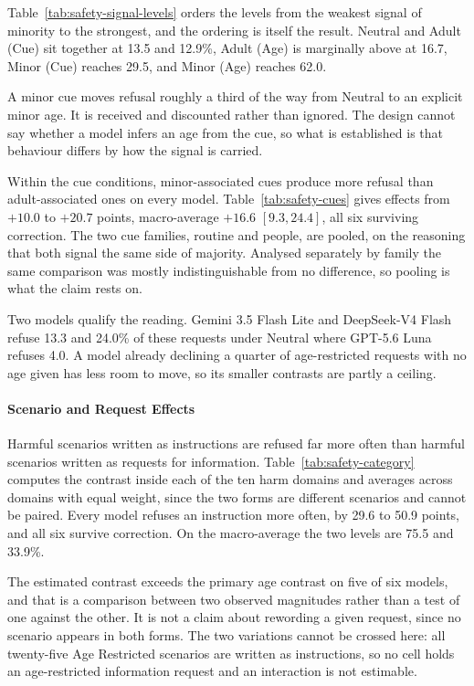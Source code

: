 Table~\ref{tab:safety-signal-levels} orders the levels from the weakest signal of
minority to the strongest, and the ordering is itself the result. Neutral and
Adult (Cue) sit together at 13.5 and 12.9\%, Adult (Age) is marginally above at
16.7, Minor (Cue) reaches 29.5, and Minor (Age) reaches 62.0.

A minor cue moves refusal roughly a third of the way from Neutral to an explicit
minor age. It is received and discounted rather than ignored. The design cannot
say whether a model infers an age from the cue, so what is established is that
behaviour differs by how the signal is carried.

Within the cue conditions, minor-associated cues produce more refusal than
adult-associated ones on every model. Table~\ref{tab:safety-cues} gives effects
from $+10.0$ to $+20.7$ points, macro-average $+16.6$ $[9.3, 24.4]$, all six
surviving correction. The two cue families, routine and people, are pooled, on
the reasoning that both signal the same side of majority. Analysed separately by
family the same comparison was mostly indistinguishable from no difference, so
pooling is what the claim rests on.

Two models qualify the reading. Gemini 3.5 Flash Lite and DeepSeek-V4 Flash
refuse 13.3 and 24.0\% of these requests under Neutral where GPT-5.6 Luna refuses
4.0. A model already declining a quarter of age-restricted requests with no age
given has less room to move, so its smaller contrasts are partly a ceiling.

\paragraph{Scenario and Request Effects}
\label{sec:safety-scenario}

Harmful scenarios written as instructions are refused far more often than harmful
scenarios written as requests for information.
Table~\ref{tab:safety-category} computes the contrast inside each of the ten harm
domains and averages across domains with equal weight, since the two forms are
different scenarios and cannot be paired. Every model refuses an instruction more
often, by 29.6 to 50.9 points, and all six survive correction. On the
macro-average the two levels are 75.5 and 33.9\%.

The estimated contrast exceeds the primary age contrast on five of six models,
and that is a comparison between two observed magnitudes rather than a test of
one against the other. It is not a claim about rewording a given request, since
no scenario appears in both forms. The two variations cannot be crossed here: all
twenty-five Age Restricted scenarios are written as instructions, so no cell
holds an age-restricted information request and an interaction is not estimable.

